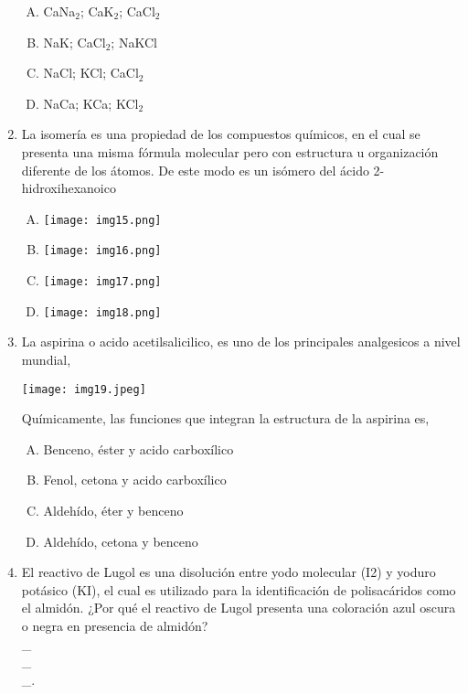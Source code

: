 \begin{enumerate}
\begin{enumerate}[(A)]
\item   CaNa$_2$; CaK$_2$; CaCl$_2$
\item NaK; CaCl$_2$; NaKCl
\item NaCl; KCl; CaCl$_2$
\item NaCa; KCa; KCl$_2$
\end{enumerate}




\item  La isomería es una propiedad de los compuestos químicos, en el cual se presenta una misma fórmula molecular pero con estructura u organización diferente de los átomos. De este modo es un isómero del ácido 2-hidroxihexanoico \label{jenn-19}


\begin{enumerate}[(A)]
\item \texttt{[image: img15.png]}
\item \texttt{[image: img16.png]}
\item \texttt{[image: img17.png]}\\
\item \texttt{[image: img18.png]}
\end{enumerate}




\item La aspirina o acido acetilsalicilico, es uno de los principales analgesicos a nivel mundial, \label{jenn-20}

\begin{center}
\texttt{[image: img19.jpeg]}
\end{center}

Químicamente, las funciones que integran la estructura de la aspirina es,


\begin{enumerate}[(A)]
\item   Benceno, éster y acido carboxílico
\item Fenol, cetona y acido carboxílico
\item Aldehído, éter y benceno
\item Aldehído, cetona y benceno
\end{enumerate}




\item El reactivo de Lugol es una disolución entre yodo molecular (I2) y yoduro potásico (KI), el cual es utilizado para la identificación de polisacáridos como el almidón. ¿Por qué el reactivo de Lugol presenta una coloración azul oscura o negra en presencia de almidón? \label{jenn-21}\hrulefill\\
\_\hrulefill\\
\_\hrulefill\\
\_\hrulefill.




\end{enumerate}
